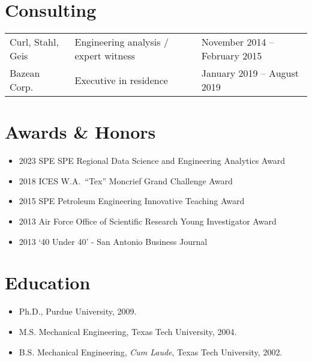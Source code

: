 \section*{Consulting}

\begin{tabular}{lll}
    Curl, Stahl, Geis  & Engineering analysis / expert witness  & November 2014 -- February 2015 \\
    Bazean Corp. & Executive in residence & January 2019 -- August 2019
\end{tabular}

\section*{Awards \& Honors}

\begin{itemize}
    \item 2023 SPE SPE Regional Data Science and Engineering Analytics Award 
    \item 2018 ICES W.A.\ ``Tex'' Moncrief Grand Challenge Award
    \item 2015 SPE Petroleum Engineering Innovative Teaching Award 
    \item 2013 Air Force Office of Scientific Research Young Investigator Award
    \item 2013 `40 Under 40' - San Antonio Business Journal
\end{itemize}
\else
\section*{Education}

\begin{itemize}
    \item Ph.D., Purdue University, 2009.
    \item M.S. Mechanical Engineering, Texas Tech University, 2004.
    \item B.S. Mechanical Engineering, \textit{Cum Laude},
    Texas Tech University, 2002.
\end{itemize}


